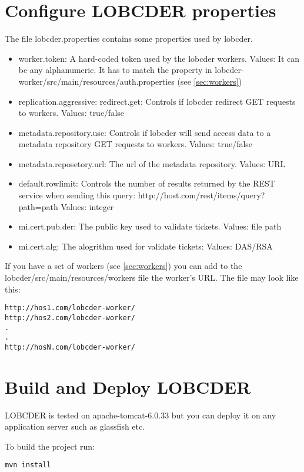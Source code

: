 \documentclass[a4paper,10pt]{article}
\begin{document}
\section{Configure LOBCDER properties}\label{sec:lobProp}
The file lobcder.properties contains some properties used by lobcder. 

\begin{itemize}
 \item worker.token: A hard-coded token used by the lobcder workers. Values: It can be any alphanumeric. It has to match the property in lobcder-worker/src/main/resources/auth.properties (see \ref{sec:workers})
 \item replication.aggressive: 
 \itam redirect.get: Controls if lobcder redirect GET requests to workers. Values: true/false
 \item metadata.repository.use: Controls if lobcder will send access data to a metadata repository GET requests to workers. Values: true/false
 \item metadata.reposetory.url: The url of the metadata repository. Values: URL 
 \item default.rowlimit: Controls the number of results returned by the REST service when sending this query: http://host.com/rest/items/query?path={path} Values: integer
  \item mi.cert.pub.der: The public key used to validate tickets. Values: file path 
  \item mi.cert.alg: The alogrithm used for validate tickets:  Values: DAS/RSA
\end{itemize}


If you have a set of workers (see \ref{sec:workers}) you can add to the lobcder/src/main/resources/workers file the worker's URL. The file may look like this:

\begin{lstlisting}
http://hos1.com/lobcder-worker/
http://hos2.com/lobcder-worker/
.
.
http://hosN.com/lobcder-worker/
\end{lstlisting}


\section{Build and Deploy LOBCDER}
LOBCDER is tested on apache-tomcat-6.0.33 but you can deploy it on any application server such as glassfish etc. 

To build the project run:
\begin{lstlisting}
mvn install
\end{lstlisting}
\end{document}
